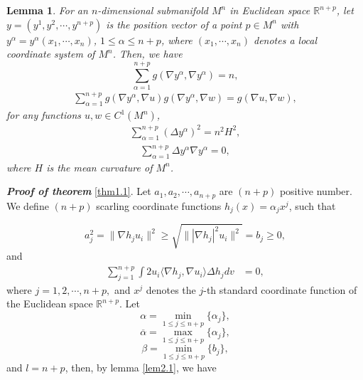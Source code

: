 \documentclass[12pt]{article}
\newtheorem{lem}[thm]{Lemma}
\numberwithin{equation}{section}
\begin{document}
\begin{lem}\label{lem3.1}
For  an $n$-dimensional  submanifold  $M^{n}$ in Euclidean space
$\mathbb{R}^{n+p}$,   let $y=(y^{1},y^{2},\cdots,y^{n+p})$ is the
position vector of a point $p\in M^{n}$ with
$y^{\alpha}=y^{\alpha}(x_{1}, \cdots, x_{n})$, $1\leq \alpha\leq
n+p$, where $(x_{1}, \cdots, x_{n})$ denotes a local coordinate
system of $M^n$. Then, we have
\begin{equation*}
\sum^{n+p}_{\alpha=1}g(\nabla y^{\alpha},\nabla y^{\alpha})= n,
\end{equation*}
\begin{equation*}
\begin{aligned}
\sum^{n+p}_{\alpha=1}g(\nabla y^{\alpha},\nabla u)g(\nabla
y^{\alpha},\nabla w)=g(\nabla u,\nabla w),
\end{aligned}
\end{equation*}
for any functions  $u, w\in C^{1}(M^{n})$,
\begin{equation*}
\begin{aligned}
\sum^{n+p}_{\alpha=1}(\Delta y^{\alpha})^{2}=n^{2}H^{2},
\end{aligned}
\end{equation*}
\begin{equation*}
\begin{aligned}
\sum^{n+p}_{\alpha=1}\Delta y^{\alpha}\nabla y^{\alpha}= 0,
\end{aligned}
\end{equation*}
where $H$ is the mean curvature of $M^{n}$.
\end{lem}

\vskip 2mm

\textbf{\emph{Proof of theorem}} \ref{thm1.1}. Let $a_{1},a_{2},\cdots,a_{n+p}$ are $(n+p)$ positive number. We define $(n+p)$
scarling coordinate functions $h_{j}(x)=\alpha_{j}x^{j}$, such that

\begin{equation}\label{a-b-in}a_{j}^{2}=\|\nabla h_{j}u_{i}\|^{2}\geq\sqrt{\||\nabla h_{j}|^{2}u_{i}\|^{2}}=b_{j}\geq0,\end{equation} and
\begin{equation}\begin{aligned} \label{sum-3.2}\sum_{j=1}^{n+p}\int2 u_{i}\langle\nabla h_{j},\nabla u_{i}\rangle\Delta  h_{j}dv&=0,\end{aligned}\end{equation}where   $j=1,2,\cdots,n+p,$ and $x^{j}$ denotes the $j$-th standard coordinate function of the Euclidean space $\mathbb{R}^{n+p}$.
Let $$\alpha=\min_{1\leq j\leq n+p}\{\alpha_{j}\},$$$$\overline{\alpha}=\max_{1\leq j\leq n+p}\{\alpha_{j}\},$$$$\beta=\min_{1\leq j\leq n+p}\{b_{j}\},$$
and $l=n+p$, then, by lemma \ref{lem2.1}, we have
\end{document}
